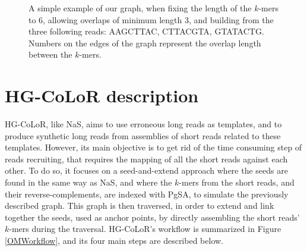 \documentclass[long, final]{jobim2017}
\begin{document}
\begin{figure}
	\begin{center}
	\end{center}
	\caption{A simple example of our graph, when fixing the length of the $k$-mers to 6, allowing overlaps of minimum length 3, and building
	from the three following reads: AAGCTTAC, CTTACGTA, GTATACTG. Numbers on the edges of the graph represent the overlap length 
	between the $k$-mers.
	\label{HGraph}}
\end{figure}

\section{HG-CoLoR description}
\label{sec:OMO}

HG-CoLoR, like NaS, aims to use erroneous long reads as templates, and to produce synthetic long reads from assemblies of short reads related to these templates. However, its main objective is to get rid of the time consuming step of reads recruiting, that requires the mapping of all the short reads against each other. To do so, it focuses on a seed-and-extend approach where the seeds are found in the same way as NaS, and where the $k$-mers from the short reads, and their reverse-complements, are indexed with PgSA, to simulate the previously described graph. This graph is then traversed, in order to extend and link together the seeds, used as anchor points, by directly assembling the short reads' $k$-mers during the traversal. HG-CoLoR's workflow is summarized in Figure \ref{OMWorkflow}, and its four main steps are described below.
\end{document}
